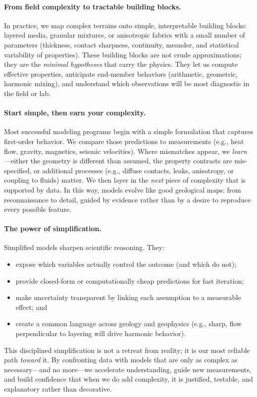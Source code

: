 \documentclass[11pt,a4paper]{article}
\begin{document}
\paragraph{From field complexity to tractable building blocks.}
In practice, we map complex terrains onto simple, interpretable building blocks: layered media, granular mixtures, or anisotropic fabrics with a small number of parameters (thickness, contact sharpness, continuity, meander, and statistical variability of properties). These building blocks are not crude approximations; they are the \emph{minimal hypotheses} that carry the physics. They let us compute effective properties, anticipate end-member behaviors (arithmetic, geometric, harmonic mixing), and understand which observations will be most diagnostic in the field or lab.

\paragraph{Start simple, then earn your complexity.}
Most successful modeling programs begin with a simple formulation that captures first-order behavior. We compare those predictions to measurements (e.g., heat flow, gravity, magnetics, seismic velocities). Where mismatches appear, we \emph{learn}—either the geometry is different than assumed, the property contrasts are mis-specified, or additional processes (e.g., diffuse contacts, leaks, anisotropy, or coupling to fluids) matter. We then layer in the \emph{next} piece of complexity that is supported by data. In this way, models evolve like good geological maps: from reconnaissance to detail, guided by evidence rather than by a desire to reproduce every possible feature.

\paragraph{The power of simplification.}
Simplified models sharpen scientific reasoning. They:
\begin{itemize}
  \item expose which variables actually control the outcome (and which do not);
  \item provide closed-form or computationally cheap predictions for fast iteration;
  \item make uncertainty transparent by linking each assumption to a measurable effect; and
  \item create a common language across geology and geophysics (e.g., sharp, flow perpendicular to layering will drive harmonic behavior).
\end{itemize}
This disciplined simplification is not a retreat from reality; it is our most reliable path \emph{toward} it. By confronting data with models that are only as complex as necessary—and no more—we accelerate understanding, guide new measurements, and build confidence that when we do add complexity, it is justified, testable, and explanatory rather than decorative.
\end{document}
